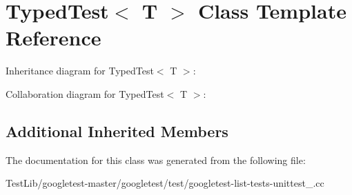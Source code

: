 \hypertarget{classTypedTest}{}\section{Typed\+Test$<$ T $>$ Class Template Reference}
\label{classTypedTest}


Inheritance diagram for Typed\+Test$<$ T $>$\+:


Collaboration diagram for Typed\+Test$<$ T $>$\+:
\subsection*{Additional Inherited Members}


The documentation for this class was generated from the following file\+:\begin{DoxyCompactItemize}
\item 
Test\+Lib/googletest-\/master/googletest/test/googletest-\/list-\/tests-\/unittest\+\_\+.\+cc\end{DoxyCompactItemize}

